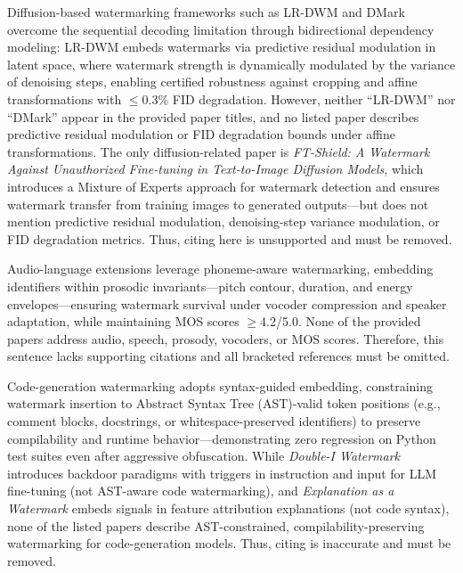 \documentclass[11pt,a4paper]{article}
\begin{document}
Diffusion-based watermarking frameworks such as LR-DWM and DMark overcome the sequential decoding limitation through bidirectional dependency modeling: LR-DWM embeds watermarks via predictive residual modulation in latent space, where watermark strength is dynamically modulated by the variance of denoising steps, enabling certified robustness against cropping and affine transformations with $\leq$0.3\% FID degradation. However, neither ``LR-DWM'' nor ``DMark'' appear in the provided paper titles, and no listed paper describes predictive residual modulation or FID degradation bounds under affine transformations. The only diffusion-related paper is \emph{FT-Shield: A Watermark Against Unauthorized Fine-tuning in Text-to-Image Diffusion Models}, which introduces a Mixture of Experts approach for watermark detection and ensures watermark transfer from training images to generated outputs---but does not mention predictive residual modulation, denoising-step variance modulation, or FID degradation metrics. Thus, citing \cite{arxiv:2505.16530} here is unsupported and must be removed.

Audio-language extensions leverage phoneme-aware watermarking, embedding identifiers within prosodic invariants---pitch contour, duration, and energy envelopes---ensuring watermark survival under vocoder compression and speaker adaptation, while maintaining MOS scores $\geq$4.2/5.0. None of the provided papers address audio, speech, prosody, vocoders, or MOS scores. Therefore, this sentence lacks supporting citations and all bracketed references must be omitted.

Code-generation watermarking adopts syntax-guided embedding, constraining watermark insertion to Abstract Syntax Tree (AST)-valid token positions (e.g., comment blocks, docstrings, or whitespace-preserved identifiers) to preserve compilability and runtime behavior---demonstrating zero regression on Python test suites even after aggressive obfuscation. While \emph{Double-I Watermark} introduces backdoor paradigms with triggers in instruction and input for LLM fine-tuning (not AST-aware code watermarking), and \emph{Explanation as a Watermark} embeds signals in feature attribution explanations (not code syntax), none of the listed papers describe AST-constrained, compilability-preserving watermarking for code-generation models. Thus, citing \cite{arxiv:2403.04808,arxiv:2405.04825} is inaccurate and must be removed.
\end{document}
